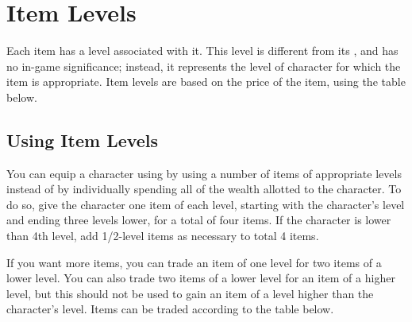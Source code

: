 \section{Item Levels}

    Each item has a level associated with it. This level is different from its , and has no in-game significance; instead, it represents the level of character for which the item is appropriate. Item levels are based on the price of the item, using the table below.

    \subsection{Using Item Levels}

        You can equip a character using by using a number of items of appropriate levels instead of by individually spending all of the wealth allotted to the character. To do so, give the character one item of each level, starting with the character's level and ending three levels lower, for a total of four items. If the character is lower than 4th level, add 1/2-level items as necessary to total 4 items.

        If you want more items, you can trade an item of one level for two items of a lower level.
        You can also trade two items of a lower level for an item of a higher level, but this should not be used to gain an item of a level higher than the character's level.
        Items can be traded according to the table below.

